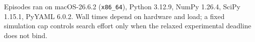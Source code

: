 Episodes ran on macOS-26.6.2 (\texttt{x86\_64}), Python 3.12.9,
NumPy 1.26.4, SciPy 1.15.1, PyYAML 6.0.2.
Wall times depend on hardware and load; a fixed simulation cap controls search
effort only when the relaxed experimental deadline does not bind.
